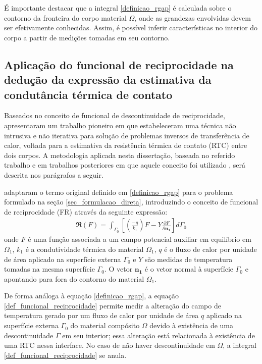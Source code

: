 É importante destacar que a integral \eqref{definicao_rgap} é calculada sobre o contorno da fronteira do corpo material $\Omega$, onde as grandezas envolvidas devem
ser efetivamente conhecidas. Assim, é possível inferir características no interior do corpo a partir de medições tomadas em seu contorno.

\subsection{Aplicação do funcional de reciprocidade na dedução da expressão da estimativa da condutância térmica de contato}\label{secao_sobre_fr}

Baseados no conceito de funcional de descontinuidade de reciprocidade, \cite{reciproc_2} apresentaram um trabalho pioneiro em que estabeleceram uma
técnica não intrusiva e não iterativa para solução de problemas inversos de transferência de calor, voltada para a estimativa da resistência térmica de
contato (RTC) entre dois corpos. A metodologia aplicada nesta dissertação, baseada no referido trabalho e em trabalhos posteriores em que aquele conceito
foi utilizado \citep{artigo_padilha_3}, será descrita nos parágrafos a seguir. 

\cite{reciproc_2} adaptaram o termo original definido em \eqref{definicao_rgap} para o problema formulado na seção \ref{sec_formulacao_direta},
introduzindo o conceito de funcional de reciprocidade (FR) através da seguinte expressão:
\begin{align}
	\Re(F) = \int_{\Gamma_0}\left[\left(\frac{-q}{k_1}\right)F - Y\frac{\partial F}{\partial\mathbf{n_1}}\right]d\Gamma_0
	\label{def_funcional_reciprocidade}
\end{align}
onde $F$ é uma função associada a um campo potencial auxiliar em equilíbrio em $\Omega_1$, $k_1$ é a condutividade térmica do material $\Omega_1$, $q$ é o fluxo de calor por unidade de área
aplicado na superfície externa $\Gamma_0$ e $Y$ são medidas de temperatura tomadas na mesma superfície $\Gamma_0$. O vetor $\mathbf{n_1}$ é o vetor normal à superfície
$\Gamma_0$ e apontando para fora do contorno do material $\Omega_1$.

De forma análoga à equação \eqref{definicao_rgap}, a equação \eqref{def_funcional_reciprocidade} permite medir a alteração do campo de temperatura
gerado por um fluxo de calor por unidade de área $q$ aplicado na superfície externa $\Gamma_0$ do material compósito $\Omega$ devido à existência
de uma descontinuidade $\Gamma$ em seu interior; essa alteração está relacionada à existência de uma RTC nessa interface. No caso de não haver descontinuidade
em $\Omega$, a integral \eqref{def_funcional_reciprocidade} se anula.


